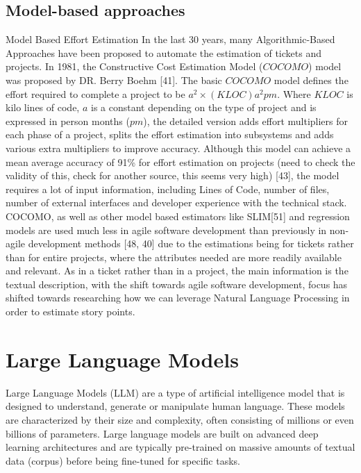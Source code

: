 \documentclass{UoYCSproject}
\begin{document}
\subsection{Model-based approaches}
\label{subsec:model-based-approaches}
Model Based Effort Estimation
In the last 30 years, many Algorithmic-Based Approaches have been proposed to automate the estimation of tickets
and projects.
In 1981, the Constructive Cost Estimation Model ($COCOMO$) model was proposed by DR. Berry Boehm [41].
The basic $COCOMO$ model defines the effort required to complete a project to be $a^2 \times (KLOC)a^2pm$.
Where $KLOC$ is kilo lines of code, $a$ is a constant depending on the type of project and is expressed in person months ($pm$), the detailed version adds effort multipliers for each phase of a project, splits the effort estimation into subsystems and adds various extra multipliers to improve accuracy.
Although this model can achieve a mean average accuracy of 91\% for effort estimation on projects (need to check the validity of this, check for another source, this seems very high) [43], the model requires a lot of input information, including Lines of Code, number of files, number of external interfaces and developer experience with the technical stack.
COCOMO, as well as other model based estimators like SLIM[51] and regression models are used much less in agile software development than previously in non-agile development methods [48, 40] due to the estimations being for tickets rather than for entire projects, where the attributes needed are more readily available and relevant.
As in a ticket rather than in a project, the main information is the textual description, with the shift towards agile software development, focus has shifted towards researching how we can leverage Natural Language Processing in order to estimate story points.

\section{Large Language Models}
\label{sec:large-language-models}
Large Language Models (LLM) are a type of artificial intelligence model that is designed to understand, generate
or manipulate human language.
These models are characterized by their size and complexity, often consisting of millions or even billions of parameters.
Large language models are built on advanced deep learning architectures and are typically pre-trained on massive amounts of textual data (corpus) before being fine-tuned for specific tasks. \par
\end{document}

